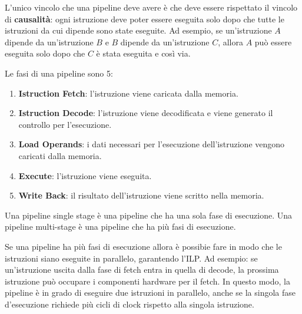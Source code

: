 L'unico vincolo che una pipeline deve avere è che deve essere rispettato il vincolo di \textbf{causalità}: ogni istruzione deve poter essere eseguita solo dopo che tutte le istruzioni da cui dipende sono state eseguite. Ad esempio, se un'istruzione $A$ dipende da un'istruzione $B$ e $B$ dipende da un'istruzione $C$, allora $A$ può essere eseguita solo dopo che $C$ è stata eseguita e così via.

\begin{remark}
    Le fasi di una pipeline sono 5:
    \begin{enumerate}
        \item \textbf{Istruction Fetch}: l'istruzione viene caricata dalla memoria.
        \item \textbf{Istruction Decode}: l'istruzione viene decodificata e viene generato il controllo per l'esecuzione.
        \item \textbf{Load Operands}: i dati necessari per l'esecuzione dell'istruzione vengono caricati dalla memoria.
        \item \textbf{Execute}: l'istruzione viene eseguita.
        \item \textbf{Write Back}: il risultato dell'istruzione viene scritto nella memoria.
    \end{enumerate}
    Una pipeline single stage è una pipeline che ha una sola fase di esecuzione. Una pipeline multi-stage è una pipeline che ha più fasi di esecuzione.
\end{remark}
Se una pipeline ha più fasi di esecuzione allora è possibie fare in modo che le istruzioni siano eseguite in parallelo, garantendo l'ILP. Ad esempio: se un'istruzione uscita dalla fase di fetch entra in quella di decode, la prossima istruzione può occupare i componenti hardware per il fetch. In questo modo, la pipeline è in grado di eseguire due istruzioni in parallelo, anche se la singola fase d'esecuzione richiede più cicli di clock rispetto alla singola istruzione.

